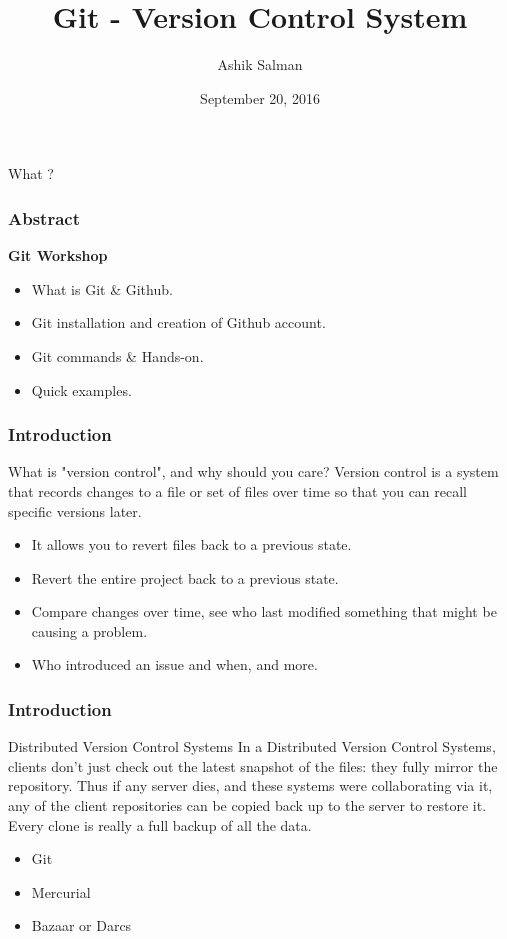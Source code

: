 \documentclass[10pt]{beamer}
\title{Git - Version Control System}
\author{Ashik Salman}
\institute[UMBC]{Beginner Workshop \\
  ..... \\
  Backend Developer \\
  Chillr, Backwater Technologies \\
  Kochi, Kerala \\

}
\date{September 20, 2016}
\begin{document}

\begin{frame}[plain]
  \titlepage
\end{frame}
	
\begin{frame}
  \begin{center}
    \Huge{What ?}
  \end{center}
\end{frame}

\begin{frame}
  \frametitle{Abstract}
  \textbf{Git Workshop}
  \medskip
  \begin{itemize}
    \item What is Git \& Github.
    \item Git installation and creation of Github account.
    \item Git commands \& Hands-on.
    \item Quick examples.
  \end{itemize}
\end{frame}

\begin{frame}
  \frametitle{Introduction}
  \begin{block}{What is "version control", and why should you care?}
    Version control is a system that records changes to a file or set of files
    over time so that you can recall specific versions later.
  \end{block}
  \medskip
  \pause
  \begin{itemize}
    \item It allows you to revert files back to a previous state.
    \item Revert the entire project back to a previous state.
    \item Compare changes over time, see who last modified something that might be causing a problem.
    \item Who introduced an issue and when, and more.
  \end{itemize}
\end{frame}

\begin{frame}
  \frametitle{Introduction}
  \begin{block}{Distributed Version Control Systems}
    In a Distributed Version Control Systems, clients don’t just check out the latest
    snapshot of the files: \alert<2>{they fully mirror the repository}. Thus if any server dies, and these systems
    were collaborating via it, any of the client repositories can be copied back up to
    the server to restore it. Every clone is really a full backup of all the data.
  \end{block}
  \medskip
  \pause
  \begin{itemize}
    \item Git
    \item Mercurial
    \item Bazaar or Darcs
  \end{itemize}
\end{frame}
\end{document}
